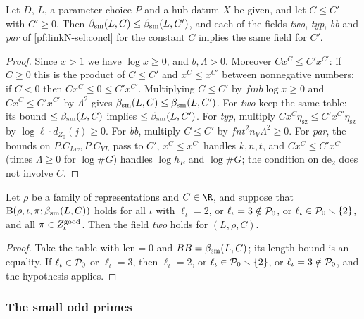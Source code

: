 \begin{lemma}\label{pf:linkN-sel:mono}
Let $D$, $L$, a parameter choice $P$ and a hub datum $X$ be given, and let $C\le C'$ with $C'\ge0$. Then
$\beta_{\mathrm{sm}}(L,C)\le\beta_{\mathrm{sm}}(L,C')$, and each of the fields \emph{two}, \emph{typ}, \emph{bb} and \emph{par} of
\cref{pf:linkN-sel:concl} for the constant $C$ implies the same field for $C'$.
\end{lemma}

\begin{proof}
Since $x>1$ we have $\log x\ge0$, and $b,\Lambda>0$. Moreover $Cx^C\le C'x^{C'}$: if $C\ge0$ this is the product of $C\le C'$ and
$x^C\le x^{C'}$ between nonnegative numbers; if $C<0$ then $Cx^C\le0\le C'x^{C'}$. Multiplying $C\le C'$ by $fmb\log x\ge0$ and
$Cx^C\le C'x^{C'}$ by $\Lambda^2$ gives $\beta_{\mathrm{sm}}(L,C)\le\beta_{\mathrm{sm}}(L,C')$. For \emph{two} keep the same table: its bound
$\le\beta_{\mathrm{sm}}(L,C)$ implies $\le\beta_{\mathrm{sm}}(L,C')$. For \emph{typ}, multiply $Cx^C\eta_{\mathrm{sz}}\le C'x^{C'}\eta_{\mathrm{sz}}$
by $\log\ell\cdot d_{Z_0}(j)\ge0$. For \emph{bb}, multiply $C\le C'$ by $fnt^2n_V\Lambda^2\ge0$. For \emph{par}, the bounds on
$P.C_{Lw},P.C_{YL}$ pass to $C'$, $x^C\le x^{C'}$ handles $k,n,t$, and $Cx^C\le C'x^{C'}$ (times $\Lambda\ge0$ for $\log\#G$) handles
$\log h_E$ and $\log\#G$; the condition on $\mathrm{de}_2$ does not involve $C$.
\end{proof}

\begin{lemma}\label{pf:linkN-sel:starF}
Let $\rho$ be a family of representations and $C\in\R$, and suppose that $\mathrm{B}(\rho,\iota,\pi;\beta_{\mathrm{sm}}(L,C))$ holds for all
$\iota$ with $\ell_\iota=2$, or $\ell_\iota=3\notin\mathcal P_0$, or $\ell_\iota\in\mathcal P_0\smallsetminus\{2\}$, and all
$\pi\in Z^{\mathrm{good}}_\iota$. Then the field \emph{two} holds for $(L,\rho,C)$.
\end{lemma}

\begin{proof}
Take the table with $\mathrm{len}=0$ and $BB=\beta_{\mathrm{sm}}(L,C)$; its length bound is an equality. If $\ell_\iota\in\mathcal P_0$ or
$\ell_\iota=3$, then $\ell_\iota=2$, or $\ell_\iota\in\mathcal P_0\smallsetminus\{2\}$, or $\ell_\iota=3\notin\mathcal P_0$, and the
hypothesis applies.
\end{proof}

\subsubsection{The small odd primes}

